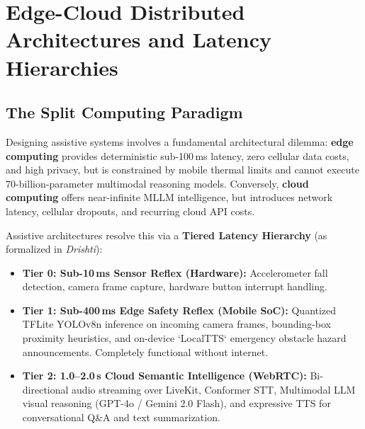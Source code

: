 \documentclass[10pt,twocolumn]{article}
\begin{document}
\section{Edge-Cloud Distributed Architectures and Latency Hierarchies}
\label{sec:edge_cloud}

\subsection{The Split Computing Paradigm}
Designing assistive systems involves a fundamental architectural dilemma: \textbf{edge computing} provides deterministic sub-100\,ms latency, zero cellular data costs, and high privacy, but is constrained by mobile thermal limits and cannot execute 70-billion-parameter multimodal reasoning models. Conversely, \textbf{cloud computing} offers near-infinite MLLM intelligence, but introduces network latency, cellular dropouts, and recurring cloud API costs.

Assistive architectures resolve this via a \textbf{Tiered Latency Hierarchy} (as formalized in \textit{Drishti}):
\begin{itemize}[leftmargin=*]
    \item \textbf{Tier 0: Sub-10\,ms Sensor Reflex (Hardware):} Accelerometer fall detection, camera frame capture, hardware button interrupt handling.
    \item \textbf{Tier 1: Sub-400\,ms Edge Safety Reflex (Mobile SoC):} Quantized TFLite YOLOv8n inference on incoming camera frames, bounding-box proximity heuristics, and on-device `LocalTTS` emergency obstacle hazard announcements. Completely functional without internet.
    \item \textbf{Tier 2: 1.0--2.0\,s Cloud Semantic Intelligence (WebRTC):} Bi-directional audio streaming over LiveKit, Conformer STT, Multimodal LLM visual reasoning (GPT-4o / Gemini 2.0 Flash), and expressive TTS for conversational Q&A and text summarization.
\end{itemize}
\end{document}
